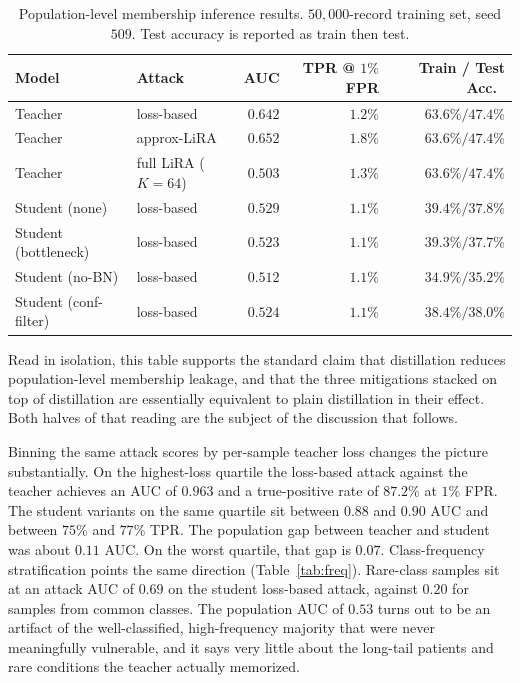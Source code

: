 \documentclass[conference]{IEEEtran}
\begin{document}
\begin{table}[t]
\caption{Population-level membership inference results. $50{,}000$-record training set, seed $509$. Test accuracy is reported as train then test.}
\label{tab:population}
\centering
\footnotesize
\setlength{\tabcolsep}{8pt}
\begin{tabular}{llrrr}
\toprule
Model & Attack & AUC & TPR @ $1\%$ FPR & Train / Test Acc.\ \\
\midrule
Teacher & loss-based & $0.642$ & $1.2\%$ & $63.6\% / 47.4\%$ \\
Teacher & approx-LiRA & $0.652$ & $1.8\%$ & $63.6\% / 47.4\%$ \\
Teacher & full LiRA ($K{=}64$) & $0.503$ & $1.3\%$ & $63.6\% / 47.4\%$ \\
\midrule
Student (none) & loss-based & $0.529$ & $1.1\%$ & $39.4\% / 37.8\%$ \\
Student (bottleneck) & loss-based & $0.523$ & $1.1\%$ & $39.3\% / 37.7\%$ \\
Student (no-BN) & loss-based & $0.512$ & $1.1\%$ & $34.9\% / 35.2\%$ \\
Student (conf-filter) & loss-based & $0.524$ & $1.1\%$ & $38.4\% / 38.0\%$ \\
\bottomrule
\end{tabular}
\end{table}

Read in isolation, this table supports the standard claim that distillation reduces population-level membership leakage, and that the three mitigations stacked on top of distillation are essentially equivalent to plain distillation in their effect. Both halves of that reading are the subject of the discussion that follows.

Binning the same attack scores by per-sample teacher loss changes the picture substantially. On the highest-loss quartile the loss-based attack against the teacher achieves an AUC of $0.963$ and a true-positive rate of $87.2\%$ at $1\%$ FPR. The student variants on the same quartile sit between $0.88$ and $0.90$ AUC and between $75\%$ and $77\%$ TPR. The population gap between teacher and student was about $0.11$ AUC. On the worst quartile, that gap is $0.07$. Class-frequency stratification points the same direction (Table~\ref{tab:freq}). Rare-class samples sit at an attack AUC of $0.69$ on the student loss-based attack, against $0.20$ for samples from common classes. The population AUC of $0.53$ turns out to be an artifact of the well-classified, high-frequency majority that were never meaningfully vulnerable, and it says very little about the long-tail patients and rare conditions the teacher actually memorized.
\end{document}
